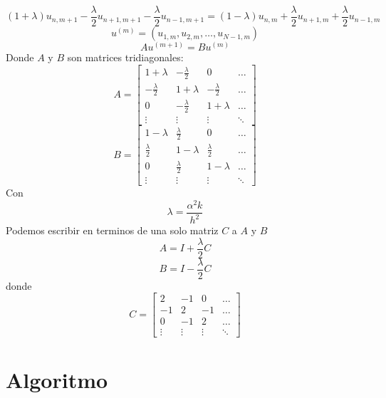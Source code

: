 \documentclass[11pt]{article} %
\begin{document}
$$(1+\lambda)u_{n,m+1}-\frac{\lambda}{2}u_{n+1,m+1}-\frac{\lambda}{2}u_{n-1,m+1}=(1-\lambda)u_{n,m}+\frac{\lambda}{2}u_{n+1,m}+\frac{\lambda}{2}u_{n-1,m}$$
$$u^{(m)}=(u_{1,m},u_{2,m},\ldots,u_{N-1,m})$$
$$Au^{(m+1)}=Bu^{(m)}$$
Donde $A$ y $B$ son matrices tridiagonales:
$$
A=
\begin{bmatrix}
  1+\lambda  & -\frac{\lambda}{2} & 0 & \ldots\\ 
 -\frac{\lambda}{2} & 1+\lambda & -\frac{\lambda}{2} & \ldots\\ 
 0 & -\frac{\lambda}{2} & 1+\lambda & \ldots\\ 
 \vdots & \vdots & \vdots & \ddots 
\end{bmatrix}
$$
$$
B=
\begin{bmatrix}
 1-\lambda  & \frac{\lambda}{2} & 0 & \ldots\\ 
 \frac{\lambda}{2} & 1-\lambda & \frac{\lambda}{2} & \ldots\\ 
 0 & \frac{\lambda}{2} & 1-\lambda & \ldots\\ 
 \vdots & \vdots & \vdots & \ddots 
\end{bmatrix}
$$
Con
$$\lambda=\dfrac{\alpha^{2}k}{h^{2}}$$
Podemos escribir en terminos de una solo matriz $C$ a $A$ y $B$
$$
A=I+\frac{\lambda}{2}C
$$
$$
B=I-\frac{\lambda}{2}C
$$
donde
$$
C=
\begin{bmatrix}
 2  & -1 & 0 & \ldots\\ 
 -1 & 2 & -1 & \ldots\\ 
 0 & -1 & 2 & \ldots\\ 
 \vdots & \vdots & \vdots & \ddots 
\end{bmatrix}
$$


\newpage
\section*{Algoritmo}
\end{document}
